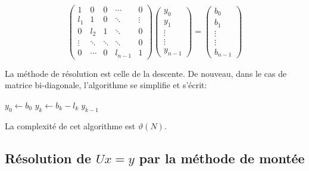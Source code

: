\documentclass{article}
\begin{document}
\begin{equation}
\begin{pmatrix}
    1 & 0 & 0 & \cdots & 0 \\
    l_1 & 1 & 0 & \ddots & \vdots \\
    0 & l_2 & 1 & \ddots & 0 \\
    \vdots & \ddots & \ddots & \ddots & 0 \\
    0 & \cdots & 0 & l_{n-1} & 1
\end{pmatrix}
\begin{pmatrix}
   y_0 \\
   y_1 \\
    \vdots\\
    \vdots \\
    y_{n-1}
\end{pmatrix}
=
\begin{pmatrix}
   b_0 \\
   b_1 \\
    \vdots\\
    \vdots \\
    b_{n-1}
\end{pmatrix}
\end{equation}

La méthode de résolution est celle de la descente. De nouveau, dans le cas de matrice bi-diagonale,
l'algorithme se simplifie et s'écrit:

\begin{algorithmic}[1]
\State $y_0 \gets b_0$
 \State $y_k \gets b_k-l_k \; y_{k-1}$
\EndFor                 
\EndFunction
\end{algorithmic}

La complexité de cet algorithme est $\vartheta(N)$.

\subsection{Résolution de $ U x= y$ par la méthode de montée}
\end{document}
